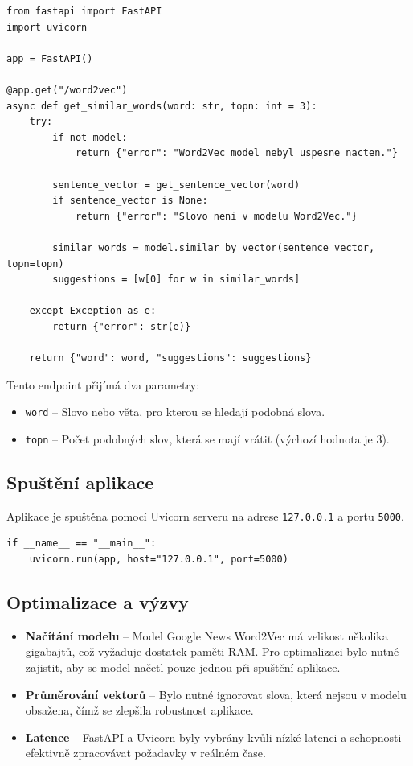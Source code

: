 \documentclass[czech, ba, kiv, he]{fasthesis}
\begin{document}
\begin{lstlisting}[caption={REST API}]
from fastapi import FastAPI
import uvicorn

app = FastAPI()

@app.get("/word2vec")
async def get_similar_words(word: str, topn: int = 3):
    try:
        if not model:
            return {"error": "Word2Vec model nebyl uspesne nacten."}

        sentence_vector = get_sentence_vector(word)
        if sentence_vector is None:
            return {"error": "Slovo neni v modelu Word2Vec."}

        similar_words = model.similar_by_vector(sentence_vector, topn=topn)
        suggestions = [w[0] for w in similar_words]

    except Exception as e:
        return {"error": str(e)}

    return {"word": word, "suggestions": suggestions}
\end{lstlisting}

Tento endpoint přijímá dva parametry:
\begin{itemize}
    \item \texttt{word} – Slovo nebo věta, pro kterou se hledají podobná slova.
    \item \texttt{topn} – Počet podobných slov, která se mají vrátit (výchozí hodnota je 3).
\end{itemize}

\subsection{Spuštění aplikace}

Aplikace je spuštěna pomocí Uvicorn serveru na adrese \texttt{127.0.0.1} a portu \texttt{5000}.

\begin{lstlisting}[caption={Spuštění aplikace}]
if __name__ == "__main__":
    uvicorn.run(app, host="127.0.0.1", port=5000)
\end{lstlisting}

\subsection{Optimalizace a výzvy}
\begin{itemize}
    \item \textbf{Načítání modelu} – Model Google News Word2Vec má velikost několika gigabajtů, což vyžaduje dostatek paměti RAM. Pro optimalizaci bylo nutné zajistit, aby se model načetl pouze jednou při spuštění aplikace.
    \item \textbf{Průměrování vektorů} – Bylo nutné ignorovat slova, která nejsou v modelu obsažena, čímž se zlepšila robustnost aplikace.
    \item \textbf{Latence} – FastAPI a Uvicorn byly vybrány kvůli nízké latenci a schopnosti efektivně zpracovávat požadavky v reálném čase.
\end{itemize}
\end{document}
